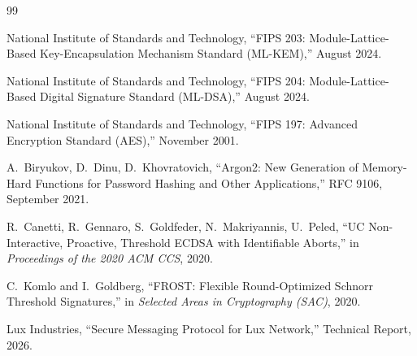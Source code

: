\documentclass[11pt,a4paper]{article}
\begin{document}
\begin{thebibliography}{99}

  National Institute of Standards and Technology,
  ``FIPS 203: Module-Lattice-Based Key-Encapsulation Mechanism Standard (ML-KEM),''
  August 2024.

  National Institute of Standards and Technology,
  ``FIPS 204: Module-Lattice-Based Digital Signature Standard (ML-DSA),''
  August 2024.

  National Institute of Standards and Technology,
  ``FIPS 197: Advanced Encryption Standard (AES),''
  November 2001.

  A.~Biryukov, D.~Dinu, D.~Khovratovich,
  ``Argon2: New Generation of Memory-Hard Functions for Password Hashing and Other Applications,''
  RFC 9106, September 2021.

  R.~Canetti, R.~Gennaro, S.~Goldfeder, N.~Makriyannis, U.~Peled,
  ``UC Non-Interactive, Proactive, Threshold ECDSA with Identifiable Aborts,''
  in \emph{Proceedings of the 2020 ACM CCS}, 2020.

  C.~Komlo and I.~Goldberg,
  ``FROST: Flexible Round-Optimized Schnorr Threshold Signatures,''
  in \emph{Selected Areas in Cryptography (SAC)}, 2020.

  Lux Industries,
  ``Secure Messaging Protocol for Lux Network,''
  Technical Report, 2026.

\end{thebibliography}
\end{document}
